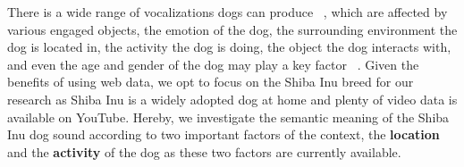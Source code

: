 There is a wide range of vocalizations dogs can produce ~\cite{yeon2007vocal}, which are affected by various engaged objects, the emotion of the dog, the surrounding environment the dog is located in, the activity the dog is doing, the object the dog interacts with, and even the age and gender of the dog may play a key factor ~\cite{pongracz2005human,molnar2009dogs}. 
Given the benefits of using web data, we opt to focus on the Shiba Inu breed for our research as Shiba Inu is a widely adopted dog at home and plenty of video data is available on YouTube. Hereby, we investigate the semantic meaning of the Shiba Inu dog sound according to two important factors of the context, the \textbf{location} and the \textbf{activity} of the dog as these two factors are currently available. 

 

